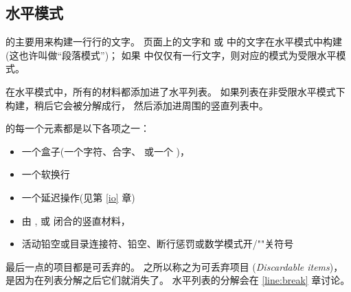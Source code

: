 \documentclass{book}
\begin{document}
\subsection{水平模式}

的主要用来构建一行行的文字。
页面上的文字和  或  中的文字在水平模式中构建
(这也许叫做“段落模式”)；
如果  中仅仅有一行文字，则对应的模式为受限水平模式。

在水平模式中，所有的材料都添加进了水平列表。
如果列表在非受限水平模式下构建，稍后它会被分解成行，
然后添加进周围的竖直列表中。

的每一个元素都是以下各项之一：
\begin{itemize}
  \item 一个盒子(一个字符、合字、 或一个 )，
  \item 一个软换行
  \item 一个延迟操作(见第 \ref{io} 章)
  \item 由 ,  或  闭合的竖直材料，
  \item 
\mdqon
活动铅空或目录连接符、铅空、断行惩罚或数学模式开/""关符号
\mdqoff
\end{itemize}
最后一点的项目都是可丢弃的。
之所以称之为可丢弃项目
(\emph{Discardable items})，
是因为在列表分解之后它们就消失了。
水平列表的分解会在 \ref{line:break} 章讨论。
\end{document}

